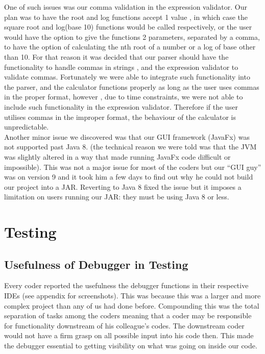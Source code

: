 \documentclass[a4paper, 12pt]{article}
\begin{document}
One of such issues was our comma validation in the expression validator. Our plan was to have the root and log functions accept 1 value , in which case the square root and log(base 10) functions would be called respectively, or the user would have the option to give the functions 2 parameters, separated by a comma, to have the option of calculating the nth root of a number or a log of base other than 10. For that reason it was decided that our parser should have the functionality to handle commas in strings , and the expression validator to validate commas. Fortunately we were able to integrate such functionality into the parser, and the calculator functions properly as long as the user uses commas in the proper format, however , due to time constraints, we were not able to include such functionality in the expression validator. Therefore if the user utilises commas in the improper format, the behaviour of the calculator is unpredictable.
\\

Another minor issue we discovered was that our GUI framework (JavaFx) was not supported past Java 8. (the technical reason we were told was that the JVM was slightly altered in a way that made running JavaFx code difficult or impossible). This was not a major issue for most of the coders but our “GUI guy” was on version 9 and it took him a few days to find out why he could not build our project into a JAR. Reverting to Java 8 fixed the issue but it imposes a limitation on users running our JAR: they must be using Java 8 or less.


\section{Testing}

\subsection{Usefulness of Debugger in Testing}

Every coder reported the usefulness the debugger functions in their respective IDEs (see appendix for screenshots). This was because this was a larger and more complex project than any of us had done before. Compounding this was the total separation of tasks among the coders meaning that a coder may be responsible for functionality downstream of his colleague’s codes. The downstream coder would not have a firm grasp on all possible input into his code then. This made the debugger essential to getting visibility on what was going on inside our code.
\\
\end{document}

